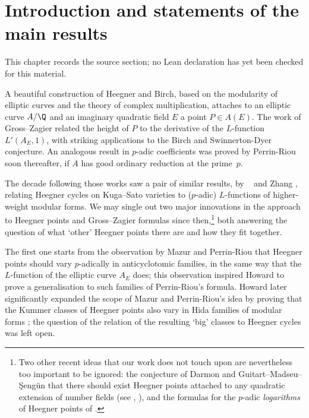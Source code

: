 \chapter{Introduction and statements of the main results}
\label{universal-p-adic-gross-zagier-formula-chapter-01}

\begin{remark}
\label{universal-p-adic-gross-zagier-formula-chapter-01-source}
This chapter records the source section; no Lean declaration has yet been checked for this material.
\notready
\end{remark}

A beautiful construction of Heegner and Birch, based on the modularity of elliptic curves and the theory of complex multiplication,  attaches to an elliptic curve $A/\Q$ and an imaginary quadratic field $E$ a point $P\in A(E)$. The work of Gross--Zagier \cite{GZ} related the height of $P$
   to   the derivative of the  $L$-function $L'(A_{E}, 1)$, with striking applications to the Birch and Swinnerton-Dyer conjecture. An analogous result in $p$-adic coefficients was proved  by Perrin-Riou \cite{pr} soon thereafter, if $A$ has good ordinary reduction  at the prime~$p$.



The decade following those works saw a pair of
   similar results, by \nek\ \cite{nek-heeg} and Zhang \cite{zhang-hcycles},  relating   Heegner cycles on Kuga--Sato varieties to ($p$-adic) $L$-functions of higher-weight modular forms.
We may single out two  major innovations in the approach to Heegner points and Gross--Zagier formulas since then,\footnote{Two other recent  ideas  that our work does not touch upon are nevertheless too important to be ignored: the conjecture of Darmon and Guitart--Madseu--{\c Seng\"un}  that there should exist Heegner points attached to any quadratic extension of number fields (see \cite{darmon-hhp}, \cite{gms}), and the
formulas for the $p$-adic \emph{logarithms} of Heegner points of  \cite{bdp,LZZ}.} both answering the question of what `other' Heegner points there are and how they fit together.

 The first one starts from the observation by Mazur \cite{mazur-icm} and Perrin-Riou \cite{PR2} that Heegner points should vary $p$-adically in anticyclotomic families, in the same way that the $L$-function of the elliptic curve $A_{E}$ does; this observation inspired  Howard \cite{howard}
to prove a generalisation to such families of Perrin-Riou's formula. Howard later significantly expanded the scope of Mazur and Perrin-Riou's  idea by proving that the Kummer classes of Heegner points  also vary in Hida families of modular forms \cite{howbig}; the question of the relation of the resulting `big' classes to Heegner cycles was left open.

